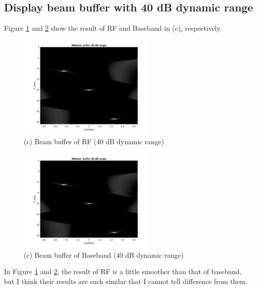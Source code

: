 \documentclass{article}
\begin{document}
\subsection{Display beam buffer with 40 dB dynamic range}
Figure \ref{fig:RF-b-40db} and \ref{fig:Base-b-40db} show the result of RF and Baseband in (c), respectively.
\begin{figure}[H]
    \centering
    \includegraphics[width=0.6\textwidth]{src/RF/b-8.pdf}
    \caption{(c) Beam buffer of RF (40 dB dynamic range)}
    \label{fig:RF-b-40db}
\end{figure}
\begin{figure}[H]
    \centering
    \includegraphics[width=0.6\textwidth]{src/Base/b-5.pdf}
    \caption{(c) Beam buffer of Baseband (40 dB dynamic range)}
    \label{fig:Base-b-40db}
\end{figure}
In Figure \ref{fig:RF-b-40db} and \ref{fig:Base-b-40db}, the result of RF is a little smoother than that of baseband, but I think
their results are such similar that I cannot tell difference from them.
\end{document}
